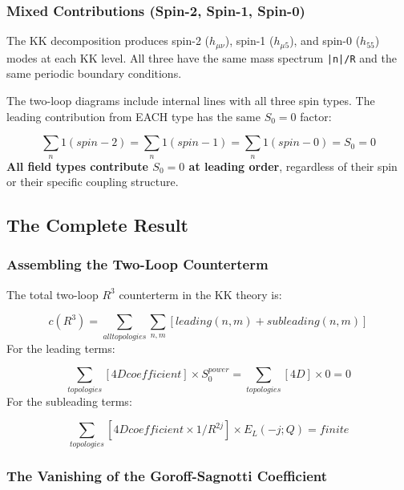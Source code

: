 \documentclass[aps,prd,preprint,superscriptaddress,longbibliography,floatfix]{revtex4-2}
\theoremstyle{remark}
\begin{document}
\subsubsection{Mixed Contributions (Spin-2, Spin-1, Spin-0)}

The KK decomposition produces spin-2 ($h_{\mu\nu}$), spin-1 ($h_{\mu5}$), and spin-0 ($h_{55}$) modes at each KK level. All three have the same mass spectrum \texttt{|n|/R} and the same periodic boundary conditions.

The two-loop diagrams include internal lines with all three spin types. The leading contribution from EACH type has the same $S_{0} = 0$ factor:


\begin{equation}
    \sum_n 1 (spin-2) = \sum_n 1 (spin-1) = \sum_n 1 (spin-0) = S_{0} = 0
\end{equation}
\textbf{All field types contribute $S_{0} = 0$ at leading order}, regardless of their spin or their specific coupling structure.



\subsection{The Complete Result}


\subsubsection{Assembling the Two-Loop Counterterm}

The total two-loop $R^{3}$ counterterm in the KK theory is:


\begin{equation}
    c(R^{3}) = \sum_{all topologies} \sum_{n,m} [leading(n,m) + subleading(n,m)]
\end{equation}
For the leading terms:


\begin{equation}
    \sum_{topologies} [4D coefficient] \times S_{0}^{power} = \sum_{topologies} [4D] \times 0 = 0
\end{equation}
For the subleading terms:


\begin{equation}
    \sum_{topologies} [4D coefficient \times 1/R^{2j}] \times E_L(-j; Q) = finite
\end{equation}

\subsubsection{The Vanishing of the Goroff-Sagnotti Coefficient}
\end{document}
